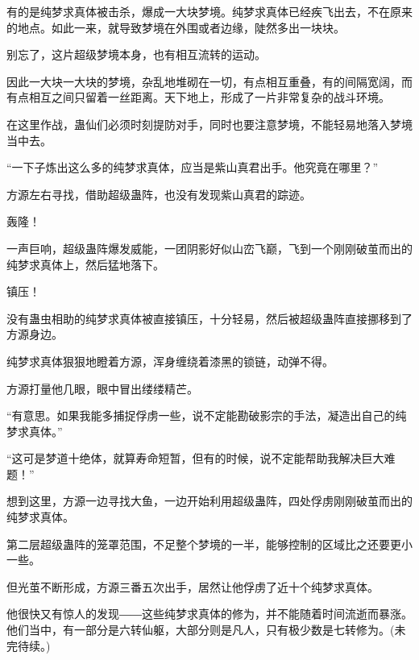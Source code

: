 \begin{this_body}
有的是纯梦求真体被击杀，爆成一大块梦境。纯梦求真体已经疾飞出去，不在原来的地点。如此一来，就导致梦境在外围或者边缘，陡然多出一块块。

别忘了，这片超级梦境本身，也有相互流转的运动。

因此一大块一大块的梦境，杂乱地堆砌在一切，有点相互重叠，有的间隔宽阔，而有点相互之间只留着一丝距离。天下地上，形成了一片非常复杂的战斗环境。

在这里作战，蛊仙们必须时刻提防对手，同时也要注意梦境，不能轻易地落入梦境当中去。

“一下子炼出这么多的纯梦求真体，应当是紫山真君出手。他究竟在哪里？”

方源左右寻找，借助超级蛊阵，也没有发现紫山真君的踪迹。

轰隆！

一声巨响，超级蛊阵爆发威能，一团阴影好似山峦飞巅，飞到一个刚刚破茧而出的纯梦求真体上，然后猛地落下。

镇压！

没有蛊虫相助的纯梦求真体被直接镇压，十分轻易，然后被超级蛊阵直接挪移到了方源身边。

纯梦求真体狠狠地瞪着方源，浑身缠绕着漆黑的锁链，动弹不得。

方源打量他几眼，眼中冒出缕缕精芒。

“有意思。如果我能多捕捉俘虏一些，说不定能勘破影宗的手法，凝造出自己的纯梦求真体。”

“这可是梦道十绝体，就算寿命短暂，但有的时候，说不定能帮助我解决巨大难题！”

想到这里，方源一边寻找大鱼，一边开始利用超级蛊阵，四处俘虏刚刚破茧而出的纯梦求真体。

第二层超级蛊阵的笼罩范围，不足整个梦境的一半，能够控制的区域比之还要更小一些。

但光茧不断形成，方源三番五次出手，居然让他俘虏了近十个纯梦求真体。

他很快又有惊人的发现――这些纯梦求真体的修为，并不能随着时间流逝而暴涨。他们当中，有一部分是六转仙躯，大部分则是凡人，只有极少数是七转修为。(未完待续。)

\end{this_body}

